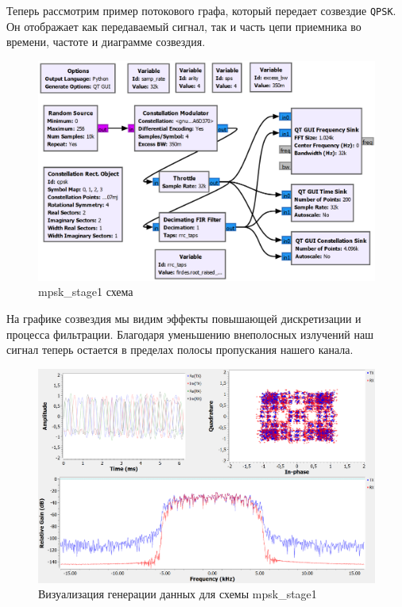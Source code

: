 \documentclass[a4paper,12pt]{report}
\begin{document}
Теперь рассмотрим пример потокового графа, который передает созвездие \texttt{QPSK}. Он отображает как передаваемый сигнал, так и часть цепи приемника во времени, частоте и диаграмме созвездия.

\begin{figure}[H]
        \centering
        \includegraphics[width=1.0\textwidth]{3.png}
        \caption{mpsk\_stage1 схема}
        \label{fig:lab12_fig1_3}
\end{figure}

На графике созвездия мы видим эффекты повышающей дискретизации и процесса фильтрации. Благодаря уменьшению внеполосных излучений наш сигнал теперь остается в пределах полосы пропускания нашего канала.

\begin{figure}[H]
        \centering
        \includegraphics[width=1.0\textwidth]{4.png}
        \caption{Визуализация генерации данных для схемы mpsk\_stage1}
        \label{fig:lab12_fig1_4}
\end{figure}
\end{document}
